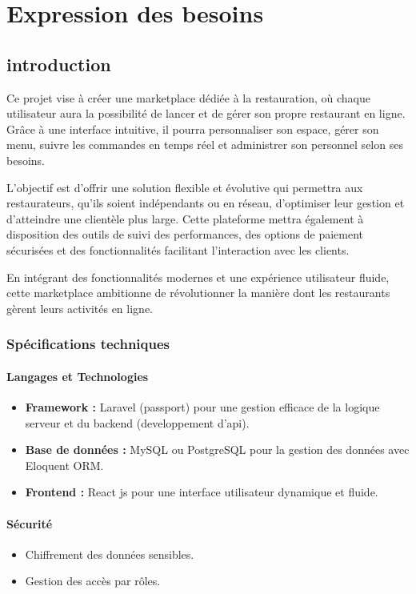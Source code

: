 \chapter{Expression des besoins}
\clearpage
\section{introduction}
Ce projet vise à créer une marketplace dédiée à la restauration, où chaque utilisateur aura la possibilité de lancer et de gérer son propre restaurant en ligne. Grâce à une interface intuitive, il pourra personnaliser son espace, gérer son menu, suivre les commandes en temps réel et administrer son personnel selon ses besoins.  

L’objectif est d’offrir une solution flexible et évolutive qui permettra aux restaurateurs, qu’ils soient indépendants ou en réseau, d’optimiser leur gestion et d’atteindre une clientèle plus large. Cette plateforme mettra également à disposition des outils de suivi des performances, des options de paiement sécurisées et des fonctionnalités facilitant l’interaction avec les clients.  

En intégrant des fonctionnalités modernes et une expérience utilisateur fluide, cette marketplace ambitionne de révolutionner la manière dont les restaurants gèrent leurs activités en ligne.  


\subsection{Spécifications techniques}

\subsubsection{Langages et Technologies}
\begin{itemize}
    \item \textbf{Framework :} Laravel (passport) pour une gestion efficace de la logique serveur et du backend (developpement d'api).
    \item \textbf{Base de données :} MySQL ou PostgreSQL pour la gestion des données avec Eloquent ORM.
    \item \textbf{Frontend :} React js pour une interface utilisateur dynamique et fluide.

\end{itemize}


\subsubsection{Sécurité}
\begin{itemize}
    \item Chiffrement des données sensibles.
    \item Gestion des accès par rôles.
\end{itemize}

